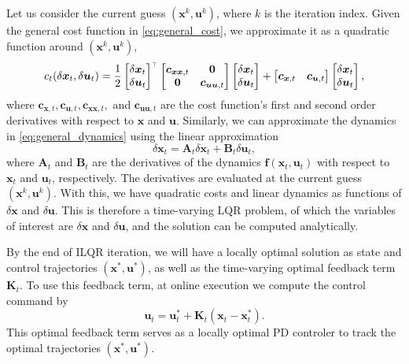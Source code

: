Let us consider the current guess $(\bm{x}^k, \bm{u}^k)$, where $k$ is the iteration index. Given the general cost function in \eqref{eq:general_cost}, we approximate it as a quadratic function around $(\bm{x}^k, \bm{u}^k)$,
\begin{multline} 
\hfill
\centering
c_t(\delta\bm{x}_t, \delta\bm{u}_t) = \frac{1}{2} 
\begin{bmatrix}
\delta \bm{x}_t \\ \delta \bm{u}_t 
\end{bmatrix}
^\trsp
\begin{bmatrix}
\bm{c}_{\bm{xx},t} & \bm{0} \\ \bm{0} & \bm{c}_{\bm{uu},t}
\end{bmatrix}
\begin{bmatrix}
\delta \bm{x}_t \\ \delta \bm{u}_t 
\end{bmatrix}
 + 
\begin{bmatrix}
\bm{c}_{\bm{x},t} &  \bm{c}_{\bm{u},t}
\end{bmatrix}
\begin{bmatrix}
\delta \bm{x}_t \\ \delta \bm{u}_t 
\end{bmatrix},
\label{eq:quadratized_cost}
\end{multline}
where $\bm{c}_{\bm{x},t}, \bm{c}_{\bm{u},t}, \bm{c}_{\bm{xx},t},$ and $\bm{c}_{\bm{uu},t}$ are the cost function's first and second order derivatives with respect to $\bm{x}$ and $\bm{u}$. Similarly, we can approximate the dynamics in \eqref{eq:general_dynamics} using the linear approximation
\begin{equation}
\delta \bm{x}_t = \bm{A}_t \delta \bm{x}_t + \bm{B}_t \delta \bm{u}_t,
\label{eq:linearized_dynamics}
\end{equation}
where $\bm{A}_t$ and $\bm{B}_t$ are the derivatives of the dynamics $\bm{f}(\bm{x}_t, \bm{u}_t)$ with respect to $\bm{x}_t$ and $\bm{u}_t$, respectively. The derivatives are evaluated at the current guess $(\bm{x}^k, \bm{u}^k)$. With this, we have quadratic costs and linear dynamics as functions of $\delta\bm{x}$ and $\delta\bm{u}$. This is therefore a time-varying LQR problem, of which the variables of interest are $\delta\bm{x}$ and $\delta\bm{u}$, and the solution can be computed analytically. 

By the end of ILQR iteration, we will have a locally optimal solution as state and control trajectories $(\bm{x}^*, \bm{u}^*)$, as well as the time-varying optimal feedback term $\bm{K}_t$. To use this feedback term, at online execution we compute the control command by 
\begin{equation}
\bm{u}_t = \bm{u}_t^* + \bm{K}_t (\bm{x}_t - \bm{x}_t^*).
\end{equation}
This optimal feedback term serves as a locally optimal PD controler to track the optimal trajectories $(\bm{x}^*, \bm{u}^*)$. 

